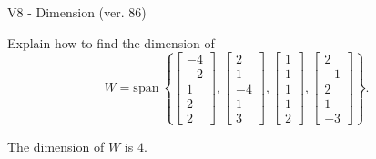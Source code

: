 \begin{exercise}
  \begin{exerciseTitle}V8 - Dimension (ver. 86)\end{exerciseTitle}
  \begin{exerciseStatement}
    Explain how to find the dimension of 
\[W=\mathrm{span}\ \left\{\left[\begin{array}{r}
-4 \\
-2 \\
1 \\
2 \\
2
\end{array}\right] , \left[\begin{array}{r}
2 \\
1 \\
-4 \\
1 \\
3
\end{array}\right] , \left[\begin{array}{r}
1 \\
1 \\
1 \\
1 \\
2
\end{array}\right] , \left[\begin{array}{r}
2 \\
-1 \\
2 \\
1 \\
-3
\end{array}\right]\right\}.\]



  \end{exerciseStatement}
  \begin{exerciseAnswer}
   The dimension of \(W\) is  \(4\).
  


  \end{exerciseAnswer}
\end{exercise}